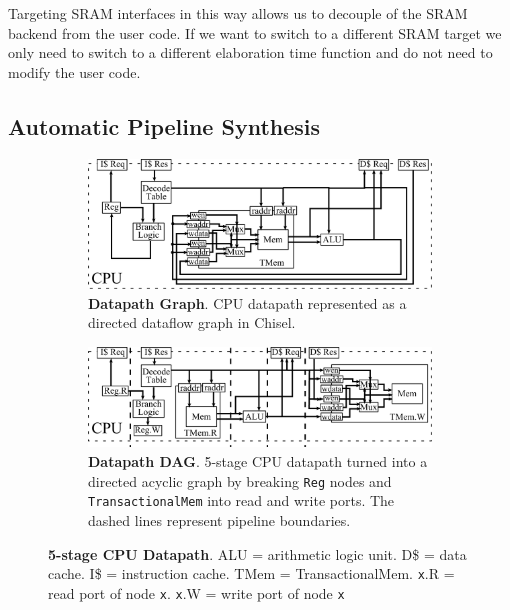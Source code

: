 Targeting SRAM interfaces in this way allows us to decouple of the
SRAM backend from the user code. If we want to switch to a different
SRAM target we only need to switch to a different elaboration time
function and do not need to modify the user code.

\subsection{Automatic Pipeline Synthesis}
\begin{figure}[htb]
\centering
  \begin{subfigure}[t]{0.8\textwidth}
  \centering
  \includegraphics[width=\textwidth]{figures/pipeline.pdf}
  \caption{{\bf Datapath Graph}. CPU datapath represented as a
    directed dataflow graph in Chisel.}
  \label{fig:datapathgrah}
  \end{subfigure}
  \begin{subfigure}[t]{0.8\textwidth}
  \vspace{20pt}
  \centering
  \includegraphics[width=\textwidth]{figures/pipelinedag.pdf}
  \caption{{\bf Datapath DAG}. 5-stage CPU datapath turned into a
    directed acyclic graph by breaking {\tt Reg} nodes and {\tt
      TransactionalMem} into read and write ports. The dashed lines
    represent pipeline boundaries.}
  \label{fig:datapathdag}
  \end{subfigure}
\caption[5-stage CPU Datapath]{{\bf 5-stage CPU Datapath}. ALU = arithmetic logic unit. D\$
  = data cache. I\$ =  instruction cache. TMem =
  TransactionalMem. {\tt x}.R = read port of node {\tt x}. {\tt x}.W =
  write port of node {\tt x}}
\label{fig:datapath}
\end{figure}

